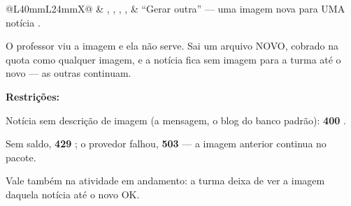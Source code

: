 \begin{tabularx}{\linewidth}{@{}L{40mm}L{24mm}X@{}}
 & , , , ,  & \enquote{Gerar outra} --- uma imagem nova para UMA notícia .\par O professor viu a imagem e ela não serve. Sai um arquivo NOVO, cobrado na quota como qualquer imagem, e a notícia fica sem imagem para a turma até o novo  --- as outras continuam.\par \textbf{Restrições:}\par \hspace*{1em}\textbullet{} Notícia sem descrição de imagem (a mensagem, o blog do banco padrão): \textbf{400} .\par \hspace*{1em}\textbullet{} Sem saldo, \textbf{429} ; o provedor falhou, \textbf{503}  --- a imagem anterior continua no pacote.\par \hspace*{1em}\textbullet{} Vale também na atividade em andamento: a turma deixa de ver a imagem daquela notícia até o novo OK.\\

\end{tabularx}
